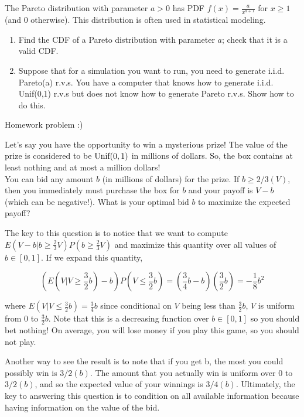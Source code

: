 \documentclass[11pt]{article}
\begin{document}
\pagebreak

\begin{exercise}
The Pareto distribution with parameter $a > 0$ has PDF $f(x) = \frac{a}{x^{a+1}}$ for $x \ge 1$ (and 0 otherwise). This distribution is often used in statistical modeling.

\begin{enumerate}
\item Find the CDF of a Pareto distribution with parameter $a$; check that it is a valid CDF.

\item Suppose that for a simulation you want to run, you need to generate i.i.d. Pareto(a) r.v.s. You have a computer that knows how to generate i.i.d. Unif(0,1) r.v.s but does not know how to generate Pareto r.v.s. Show how to do this.
\end{enumerate}
\end{exercise}

\begin{solution}
Homework problem :)
\end{solution}

\begin{exercise}
Let's say you have the opportunity to win a mysterious prize! The value of the prize is considered to be $\textrm{Unif}(0,1)$ in millions of dollars. So, the box contains at least nothing and at most a million dollars! \\

You can bid any amount $b$ (in millions of dollars) for the prize. If $b \ge 2/3(V)$, then you immediately must purchase the box for $b$ and your payoff is $V-b$ (which can be negative!). What is your optimal bid $b$ to maximize the expected payoff?
\end{exercise}

\begin{solution}
The key to this question is to notice that we want to compute $E(V-b|b \ge \frac{2}{3}V)P(b \ge \frac{2}{3}V)$ and maximize this quantity over all values of $b \in [0,1]$. If we expand this quantity,

$$(E(V|V \ge \frac{3}{2}b) - b)P(V \le \frac{3}{2}b) = (\frac{3}{4}b-b) (\frac{3}{2}b) = -\frac{1}{8}b^2$$

where $E(V|V \le \frac{3}{2}b) = \frac{3}{4}b$ since conditional on $V$ being less than $\frac{3}{2}b$, $V$ is uniform from 0 to $\frac{3}{2}b$. Note that this is a decreasing function over $b \in [0,1]$ so you should bet nothing! On average, you will lose money if you play this game, so you should not play.

Another way to see the result is to note that if you get b, the most you could possibly win is $3/2(b)$. The amount that you actually win is uniform over 0 to $3/2(b)$, and so the expected value of your winnings is $3/4(b)$. Ultimately, the key to answering this question is to condition on all available information because having information on the value of the bid.
\end{solution}
\end{document}
